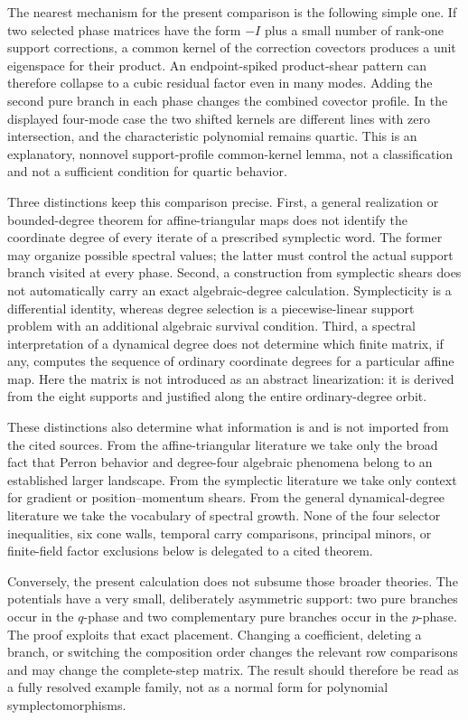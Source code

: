 \documentclass[11pt]{article}
\theoremstyle{remark}
\numberwithin{equation}{section}
\begin{document}
The nearest mechanism for the present comparison is the following simple
one.  If two selected phase matrices have the form
\(-I\) plus a small number of rank-one support corrections, a common kernel
of the correction covectors produces a unit eigenspace for their product.
An endpoint-spiked product-shear pattern can therefore collapse to a cubic
residual factor even in many modes.  Adding the second pure branch in each
phase changes the combined covector profile.  In the displayed four-mode
case the two shifted kernels are different lines with zero intersection,
and the characteristic polynomial remains quartic.  This is an
explanatory, nonnovel support-profile common-kernel lemma, not a
classification and not a sufficient condition for quartic behavior.

Three distinctions keep this comparison precise.  First, a general
realization or bounded-degree theorem for affine-triangular maps does not
identify the coordinate degree of every iterate of a prescribed
symplectic word.  The former may organize possible spectral values; the
latter must control the actual support branch visited at every phase.
Second, a construction from symplectic shears does not automatically carry
an exact algebraic-degree calculation.  Symplecticity is a differential
identity, whereas degree selection is a piecewise-linear support problem
with an additional algebraic survival condition.  Third, a spectral
interpretation of a dynamical degree does not determine which finite matrix,
if any, computes the sequence of ordinary coordinate degrees for a
particular affine map.  Here the matrix is not introduced as an abstract
linearization: it is derived from the eight supports and justified along
the entire ordinary-degree orbit.

These distinctions also determine what information is and is not imported
from the cited sources.  From the affine-triangular literature we take only
the broad fact that Perron behavior and degree-four algebraic phenomena
belong to an established larger landscape.  From the symplectic literature
we take only context for gradient or position--momentum shears.  From the
general dynamical-degree literature we take the vocabulary of spectral
growth.  None of the four selector inequalities, six cone walls, temporal
carry comparisons, principal minors, or finite-field factor exclusions
below is delegated to a cited theorem.

Conversely, the present calculation does not subsume those broader
theories.  The potentials have a very small, deliberately asymmetric
support: two pure branches occur in the \(q\)-phase and two complementary
pure branches occur in the \(p\)-phase.  The proof exploits that exact
placement.  Changing a coefficient, deleting a branch, or switching the
composition order changes the relevant row comparisons and may change the
complete-step matrix.  The result should therefore be read as a fully
resolved example family, not as a normal form for polynomial
symplectomorphisms.
\end{document}
